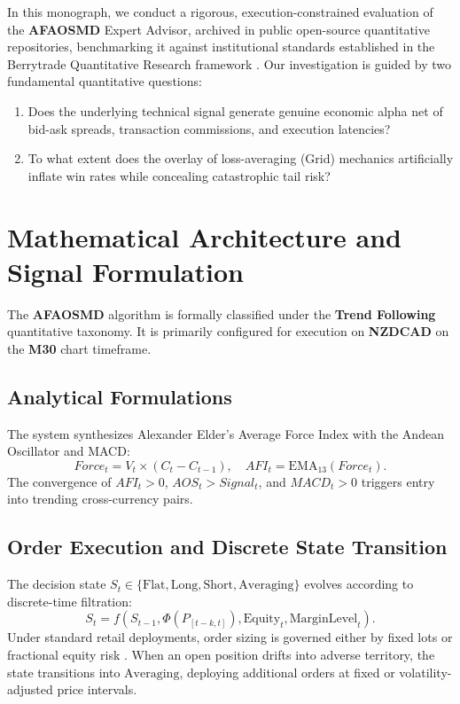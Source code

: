 \documentclass[11pt,a4paper]{article}
\begin{document}
In this monograph, we conduct a rigorous, execution-constrained evaluation of the \textbf{AFAOSMD} Expert Advisor, archived in public open-source quantitative repositories, benchmarking it against institutional standards established in the Berrytrade Quantitative Research framework \cite{artsu2026illusion}. Our investigation is guided by two fundamental quantitative questions:
\begin{enumerate}
    \item Does the underlying technical signal generate genuine economic alpha net of bid-ask spreads, transaction commissions, and execution latencies?
    \item To what extent does the overlay of loss-averaging (Grid) mechanics artificially inflate win rates while concealing catastrophic tail risk?
\end{enumerate}

\section{Mathematical Architecture and Signal Formulation}
The \textbf{AFAOSMD} algorithm is formally classified under the \textbf{Trend Following} quantitative taxonomy. It is primarily configured for execution on \textbf{NZDCAD} on the \textbf{M30} chart timeframe.

\subsection{Analytical Formulations}

The system synthesizes Alexander Elder's Average Force Index with the Andean Oscillator and MACD:
\begin{equation}
Force_t = V_t \times (C_t - C_{t-1}), \quad AFI_t = \text{EMA}_{13}(Force_t).
\end{equation}
The convergence of $AFI_t > 0$, $AOS_t > Signal_t$, and $MACD_t > 0$ triggers entry into trending cross-currency pairs.


\subsection{Order Execution and Discrete State Transition}
The decision state $S_t \in \{\text{Flat}, \text{Long}, \text{Short}, \text{Averaging}\}$ evolves according to discrete-time filtration:
\begin{equation}
S_{t} = f(S_{t-1}, \Phi(P_{[t-k, t]}), \text{Equity}_t, \text{MarginLevel}_t).
\end{equation}
Under standard retail deployments, order sizing is governed either by fixed lots or fractional equity risk \cite{lopez2018advances, carhart1997persistence}. When an open position drifts into adverse territory, the state transitions into $\text{Averaging}$, deploying additional orders at fixed or volatility-adjusted price intervals.
\end{document}
